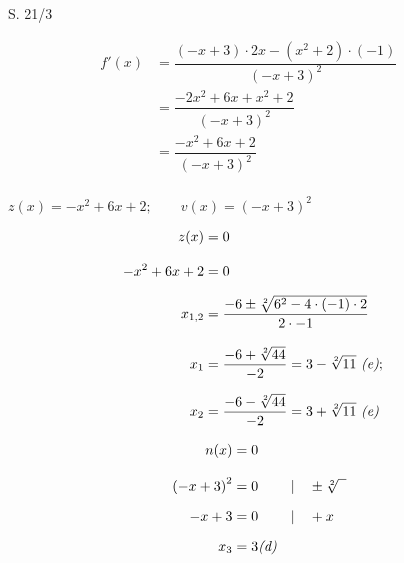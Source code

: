 \begin{Exercise}{S. 21/3}{}
\begin{enumerate}
\begin{enumerate}[label=\alph*)]
{\begin{itemize}[leftmargin=*]
{                        \begin{align*}
                            f'(x) &= \dfrac{\left(-x+3\right) \cdot 2x - \left(x^{2} +2\right)\cdot \left(-1\right)}{\left(-x+3\right)^{2}} &&\\[1.5ex]
                            &= \dfrac{-2x^{2} + 6x + x^{2} + 2}{\left(-x+3\right)^{2}} &&\\[1.5ex]
                            &= \dfrac{-x^{2} + 6x + 2}{\left(-x+3\right)^{2}} &&
                        \end{align*}\\[-1.0ex]
                        $z(x) = -x^{2} + 6x + 2; \qquad v(x) = \left(-x+3\right)^{2}$\\[-1.0ex]
                        \begin{minipage}[t]{0.60\linewidth}
                            \begin{align*}
                                z(x) &= 0 &&\\[2.0ex]
                                -x^{2} + 6x + 2 &= 0 &&\\[1.5ex]
                                x_{1,2} &= \dfrac{-6 \pm \sqrt[2]{6^{2} - 4\cdot \left(-1\right) \cdot 2}}{2 \cdot {-1}} &&\\[2.0ex]
                                x_{1} &= \dfrac{-6 + \sqrt[2]{44}}{-2} = 3 -\sqrt[2]{11} \ \text{\textit{(e)}}; &&\\[1.5ex]
                                x_{2} &= \dfrac{-6 - \sqrt[2]{44}}{-2} = 3 +\sqrt[2]{11} \ \text{\textit{(e)}} &&\\
                            \end{align*}
                        \end{minipage}
                        \hfill
                        \begin{minipage}[t]{0.30\linewidth}
                            \begin{align*}
                                n(x) &= 0 && \\[2.0ex]
                                \left(-x+3\right)^{2} &= 0 &&| \quad \pm \sqrt[2]{\phantom{x}}\\[1.5ex]
                                -x + 3&= 0 &&| \quad + x\\[1.5ex]
                                x_{3} &= 3 \text{\textit{(d)}} &&
                            \end{align*}
                        \end{minipage}\\
}
\end{itemize}}
\end{enumerate}
\end{enumerate}
\end{Exercise}
